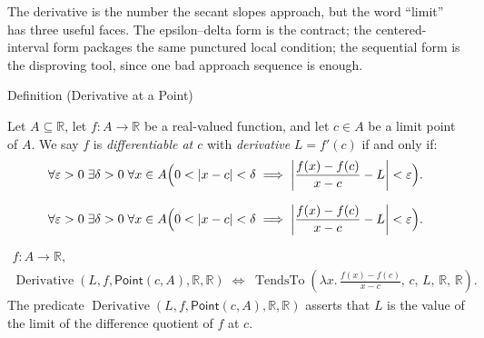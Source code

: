 
\begin{remark*}[Interpretation]
The derivative is the number the secant slopes approach, but the word
``limit'' has three useful faces. The epsilon--delta form is the contract;
the centered-interval form packages the same punctured local condition; the
sequential form is the disproving tool, since one bad approach sequence is enough.
\end{remark*}

\begin{definitionbox}{Definition (Derivative at a Point)}
\begin{definition}
\label{def:derivative-at-a-point}
Let $A \subseteq \mathbb{R}$, let $f: A \to \mathbb{R}$ be a real-valued function, and let $c \in A$ be a limit point of $A$. We say $f$ is \emph{differentiable at $c$} with \emph{derivative} $L = f'(c)$ if and only if:
\[
\forall \varepsilon > 0 \;\exists \delta > 0 \;\forall x \in A
\Bigl(0 < |x - c| < \delta \implies \left| \frac{f(x) - f(c)}{x - c} - L \right| < \varepsilon\Bigr).
\]
\end{definition}
\end{definitionbox}

\begin{remark*}
\[
\forall \varepsilon > 0 \;\exists \delta > 0 \;\forall x \in A
\Bigl(0 < |x - c| < \delta \implies \left|\frac{f(x)-f(c)}{x-c} - L\right| < \varepsilon\Bigr).
\]
\end{remark*}

\begin{remark*}
\[
\begin{aligned}
  f\colon A\to\mathbb{R},\\
\operatorname{Derivative}(L,f,\mathsf{Point}(c,A),\mathbb R,\mathbb R)
\;\Longleftrightarrow\;
\operatorname{TendsTo}\!\left(\lambda x.\,\frac{f(x)-f(c)}{x-c},\,c,\,L,\,\mathbb R,\,\mathbb R\right).
\end{aligned}
\]
The predicate
$\operatorname{Derivative}(L,f,\mathsf{Point}(c,A),\mathbb R,\mathbb R)$
asserts that $L$ is the value of the limit of the difference quotient of $f$
at $c$.
\end{remark*}

